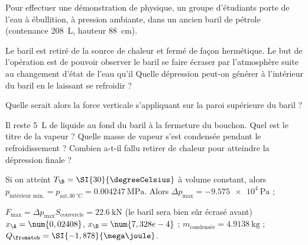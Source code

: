 \begin{Exercise}[title=Baril écrasé]
  Pour effectuer une démonstration de physique, un groupe d’étudiants porte de
  l’eau à ébullition, à pression ambiante, dans un ancien baril de pétrole
  (contenance \SI{208}{\liter}, hauteur \SI{88}{\centi\metre}).

  Le baril est retiré de la source de chaleur et fermé de façon hermétique. Le
  but de l’opération est de pouvoir observer le baril se faire écraser par
  l’atmosphère suite au changement d’état de l’eau qu’il
  \Question Quelle dépression peut-on générer à l’intérieur du baril en le
  laissant se refroidir ?

  \Question Quelle serait alors la force verticale s’appliquant sur la paroi
  supérieure du baril ?

  \Question Il reste \SI{5}{\liter} de liquide au fond du baril à la fermeture
  du bouchon. Quel est le titre de la vapeur ?
  \Question Quelle masse de vapeur s’est condensée pendant le refroidissement ?
  \Question Combien a-t-il fallu retirer de chaleur pour atteindre la dépression finale ?
\end{Exercise}
\begin{Answer}

  \Question  Si on atteint $T_\B = \SI{30}{\degreeCelsius}$ à volume constant, alors
  $p_\text{intérieur min.} = p_{\text{sat.} \SI{30}{\degreeCelsius}} =
  \SI{0,004247}{\mega\pascal}$. Alors $\Delta p_\text{max} = \SI{-9,575e4}{\pascal}$ ;

  \Question  $F_\text{max} = \Delta p_\text{max}
S_\text{couvercle} = \SI{22,6}{\kilo\newton}$ (le baril sera bien sûr écrasé avant)
  \Question  $x_\A = \num{0,02408}$, $x_\B = \num{7,328e-4}$ ;
  \Question  $m_\text{condensée} = \SI{4,9138}{\kilogram}$ ;
  \Question  ${Q}_\fromatob = \SI{-1,878}{\mega\joule}$.
\end{Answer}
